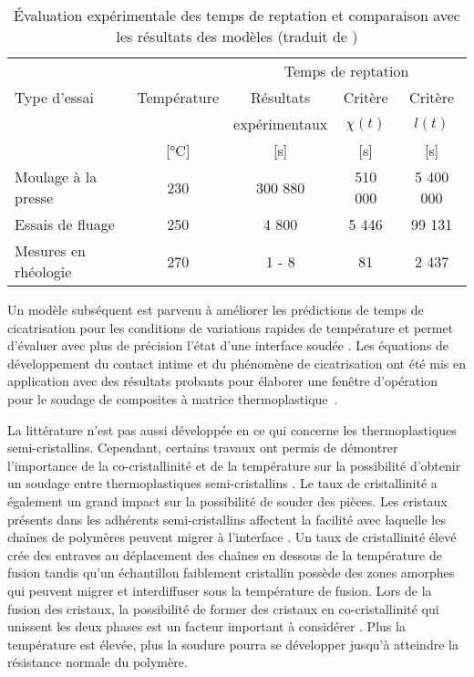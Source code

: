 \begin{table}[h]
	\centering
	\caption{Évaluation expérimentale des temps de reptation et comparaison avec les résultats des modèles (traduit de \cite{Bastien1991})}
	\label{tab:temps_de_reptation_Bastien}
		\begin{tabular}{@{}lcccc@{}}
			\toprule
			                     & \multicolumn{1}{l}{} &          \multicolumn{3}{c}{Temps de reptation}          \\
			Type d'essai         &          Température &      Résultats &          Critère &  Critère \\
			                     &                      &   expérimentaux & $\chi(t)$ & $l(t)$ \\
			                     &      [\si{\celsius}] & [\si{\second}] &   [\si{\second}] &       [\si{\second}] \\ \midrule
			Moulage à la presse  &                  230 &        300 880 &          510 000 &            5 400 000 \\
			Essais de fluage     &                  250 &           4 800 &             5 446 &               99 131 \\
			Mesures en rhéologie &                  270 &          1 - 8 &               81 &                 2 437 \\ \bottomrule
		\end{tabular}%
\end{table}

Un modèle subséquent est parvenu à améliorer les prédictions de temps de cicatrisation pour les conditions de variations rapides de température et permet d'évaluer avec plus de précision l'état d'une interface soudée \cite{F.Yang2002}. 
Les équations de développement du contact intime et du phénomène de cicatrisation ont été mis en application avec des résultats probants pour élaborer une fenêtre d'opération pour le soudage de composites à matrice thermoplastique~\cite{Ageorges1998}. 

La littérature n'est pas aussi développée en ce qui concerne les thermoplastiques semi-cristallins. 
Cependant, certains travaux ont permis de démontrer l'importance de la co-cristallinité et de la température sur la possibilité d'obtenir un soudage entre thermoplastiques semi-cristallins  \cite{Xue1998,Smith2001}. 
Le taux de cristallinité a également un grand impact sur la possibilité de souder des pièces. 
Les cristaux présents dans les adhérents semi-cristallins affectent la facilité avec laquelle les chaînes de polymères peuvent migrer à l'interface \cite{Jarrousse2004}. 
Un taux de cristallinité élevé crée des entraves au déplacement des chaînes en dessous de la température de fusion tandis qu'un échantillon faiblement cristallin possède des zones amorphes qui peuvent migrer et interdiffuser sous la température de fusion. 
Lors de la fusion des cristaux, la possibilité de former des cristaux en co-cristallinité qui unissent les deux phases est un facteur important à considérer \cite{Smith2001,Zanetto2001}. 
Plus la température est élevée, plus la soudure pourra se développer jusqu'à atteindre la résistance normale du polymère. 

